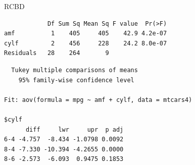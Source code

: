 \begin{frame}[fragile]{RCBD}

\begin{Shaded}
\begin{Highlighting}[]
\StringTok{ }\OperatorTok{~}\StringTok{ }\OperatorTok{+}\StringTok{ }
\end{Highlighting}
\end{Shaded}

\begin{verbatim}
            Df Sum Sq Mean Sq F value  Pr(>F)
amf          1    405     405    42.9 4.2e-07
cylf         2    456     228    24.2 8.0e-07
Residuals   28    264       9                
\end{verbatim}

\begin{Shaded}
\begin{Highlighting}[]
\NormalTok{)}
\end{Highlighting}
\end{Shaded}

\begin{verbatim}
  Tukey multiple comparisons of means
    95% family-wise confidence level

Fit: aov(formula = mpg ~ amf + cylf, data = mtcars4)

$cylf
      diff     lwr     upr  p adj
6-4 -4.757  -8.434 -1.0798 0.0092
8-4 -7.330 -10.394 -4.2655 0.0000
8-6 -2.573  -6.093  0.9475 0.1853
\end{verbatim}

\end{frame}

